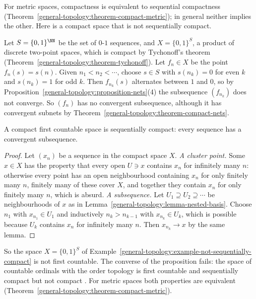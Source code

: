 For metric spaces, compactness is equivalent to sequential compactness (Theorem~\ref{general-topology:theorem-compact-metric}); in general neither implies the other. Here is a compact space that is not
sequentially compact.

\begin{example}\label{general-topology:example-not-sequentially-compact}
Let $S = \{0, 1\}^\NN$ be the set of $0$-$1$ sequences, and $X = \{0, 1\}^S$, a product of discrete two-point spaces, which is compact by Tychonoff's theorem
(Theorem~\ref{general-topology:theorem-tychonoff}). Let $f_n \in X$ be the point $f_n(s) = s(n)$. Given $n_1 < n_2 < \cdots$, choose $s \in S$ with $s(n_k) = 0$ for even $k$ and $s(n_k) = 1$ for odd $k$.
Then $f_{n_k}(s)$ alternates between $1$ and $0$, so by Proposition~\ref{general-topology:proposition-nets}(4) the subsequence $(f_{n_k})$ does not converge. So $(f_n)$ has no convergent subsequence, although it has
convergent subnets by Theorem~\ref{general-topology:theorem-compact-nets}.
\end{example}

\begin{proposition}\label{general-topology:proposition-compact-first-countable}
A compact first countable space is sequentially compact: every sequence has a convergent subsequence.
\end{proposition}

\begin{proof}
Let $(x_n)$ be a sequence in the compact space $X$. \emph{A cluster point.} Some $x \in X$ has the property that every open $U \ni x$ contains $x_n$ for infinitely many $n$: otherwise every point has an open neighbourhood
containing $x_n$ for only finitely many $n$, finitely many of these cover $X$, and together they contain $x_n$ for only finitely many $n$, which is absurd. \emph{A subsequence.} Let $U_1 \supseteq U_2 \supseteq \cdots$ be
neighbourhoods of $x$ as in Lemma~\ref{general-topology:lemma-nested-basis}. Choose $n_1$ with $x_{n_1} \in U_1$ and inductively $n_k > n_{k-1}$ with $x_{n_k} \in U_k$, which is possible because $U_k$ contains $x_n$ for
infinitely many $n$. Then $x_{n_k} \to x$ by the same lemma.
\end{proof}

So the space $X = \{0, 1\}^S$ of Example~\ref{general-topology:example-not-sequentially-compact} is not first countable. The converse of the proposition fails: the space of countable ordinals with the order topology is
first countable and sequentially compact but not compact \cite{engelking-general-topology}. For metric spaces both properties are equivalent (Theorem~\ref{general-topology:theorem-compact-metric}).


